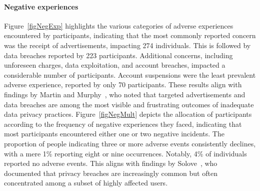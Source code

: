 \paragraph{Negative experiences}
Figure~\ref{figNegExp} highlights the various categories of adverse experiences encountered by participants, indicating that the most commonly reported concern was the receipt of advertisements, impacting 274 individuals.
This is followed by data breaches reported by 223 participants.
Additional concerns, including unforeseen charges, data exploitation, and account breaches, impacted a considerable number of participants.
Account suspensions were the least prevalent adverse experience, reported by only 70 participants.
These results align with findings by Martin and Murphy~\cite{martin2017role}, who noted that targeted advertisements and data breaches are among the most visible and frustrating outcomes of inadequate data privacy practices.
Figure~\ref{figNegMult} depicts the allocation of participants according to the frequency of negative experiences they faced, indicating that most participants encountered either one or two negative incidents.
The proportion of people indicating three or more adverse events consistently declines, with a mere 1\% reporting eight or nine occurrences.
Notably, 4\% of individuals reported no adverse events.
This aligns with findings by Solove~\cite{solove2012introduction}, who documented that privacy breaches are increasingly common but often concentrated among a subset of highly affected users.









